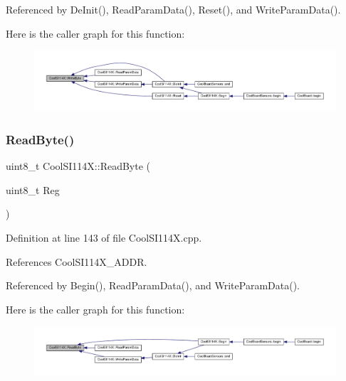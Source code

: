 Referenced by De\+Init(), Read\+Param\+Data(), Reset(), and Write\+Param\+Data().

Here is the caller graph for this function\+:
\nopagebreak
\begin{figure}[H]
\begin{center}
\leavevmode
\includegraphics[width=350pt]{dd/d67/class_cool_s_i114_x_ac5c8dc5ade604da7a1c8cd1586feefc2_icgraph}
\end{center}
\end{figure}
\mbox{\label{class_cool_s_i114_x_acc20f8037e156ec4aadcbe90780b1e8b}} 
\subsubsection{\texorpdfstring{Read\+Byte()}{ReadByte()}}
{\footnotesize\ttfamily uint8\+\_\+t Cool\+S\+I114\+X\+::\+Read\+Byte (\begin{DoxyParamCaption}\item[{uint8\+\_\+t}]{Reg }\end{DoxyParamCaption})\hspace{0.3cm}{\ttfamily [private]}}



Definition at line 143 of file Cool\+S\+I114\+X.\+cpp.



References Cool\+S\+I114\+X\+\_\+\+A\+D\+DR.



Referenced by Begin(), Read\+Param\+Data(), and Write\+Param\+Data().

Here is the caller graph for this function\+:
\nopagebreak
\begin{figure}[H]
\begin{center}
\leavevmode
\includegraphics[width=350pt]{dd/d67/class_cool_s_i114_x_acc20f8037e156ec4aadcbe90780b1e8b_icgraph}
\end{center}
\end{figure}
\mbox{\label{class_cool_s_i114_x_a1d25c9e137874af529804c2ec796a6b9}} 
